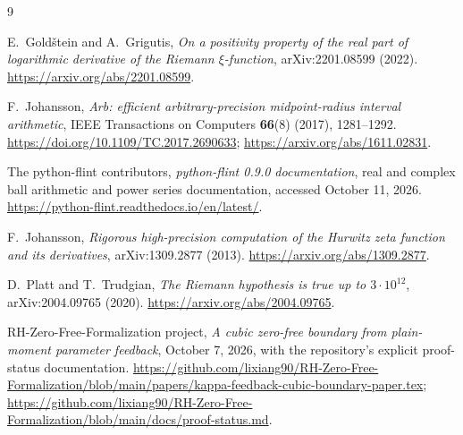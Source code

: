 \documentclass[11pt,a4paper]{article}
\theoremstyle{definition}
\begin{document}
\begin{thebibliography}{9}

E.~Gold\v{s}tein and A.~Grigutis,
\emph{On a positivity property of the real part of logarithmic
derivative of the Riemann $\xi$-function},
arXiv:2201.08599 (2022).
\url{https://arxiv.org/abs/2201.08599}.

F.~Johansson,
\emph{Arb: efficient arbitrary-precision midpoint-radius interval
arithmetic}, IEEE Transactions on Computers \textbf{66}(8)
(2017), 1281--1292.
\url{https://doi.org/10.1109/TC.2017.2690633};
\url{https://arxiv.org/abs/1611.02831}.

The python-flint contributors,
\emph{python-flint 0.9.0 documentation},
real and complex ball arithmetic and power series documentation,
accessed October 11, 2026.
\url{https://python-flint.readthedocs.io/en/latest/}.

F.~Johansson,
\emph{Rigorous high-precision computation of the Hurwitz zeta
function and its derivatives}, arXiv:1309.2877 (2013).
\url{https://arxiv.org/abs/1309.2877}.

D.~Platt and T.~Trudgian,
\emph{The Riemann hypothesis is true up to $3\cdot10^{12}$},
arXiv:2004.09765 (2020).
\url{https://arxiv.org/abs/2004.09765}.

RH-Zero-Free-Formalization project,
\emph{A cubic zero-free boundary from plain-moment parameter feedback},
October 7, 2026, with the repository's explicit proof-status documentation.
\url{https://github.com/lixiang90/RH-Zero-Free-Formalization/blob/main/papers/kappa-feedback-cubic-boundary-paper.tex};
\url{https://github.com/lixiang90/RH-Zero-Free-Formalization/blob/main/docs/proof-status.md}.

\end{thebibliography}
\end{document}
